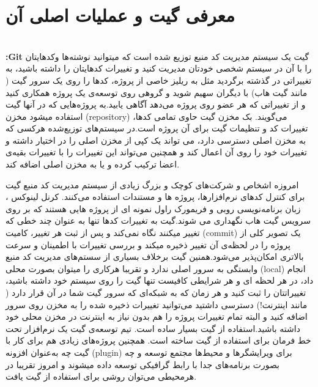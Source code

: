 
\section{معرفی گیت و عملیات اصلی آن}\ \\

\textbf{:Git} \newline
گیت یک سیستم مدیریت کد منبع توزیع شده است که میتوانید نوشته‌ها وکدهایتان را با آن در سیستم شخصی خودتان مدیریت کنید و تغییرات کدهایتان را داشته باشید، به تغییراتی در گذشته برگردید مثل  به ریلیز خاصی از پروژه، کدها را روی یک سرور گیت ( مانند گیت هاب) با دیگران سهیم شوید و گروهی روی توسعه‌ی یک پروژه همکاری کنید و از تغییراتی که هر عضو روی پروژه می‌دهد آگاهی یابید.به پروژه‌هایی که در آنها گیت استفاده میشود مخزن (repository) می‌گویند. بک مخزن گیت حاوی تمامی کدها، تغییرات کد و تنظیمات گیت برای آن پروژه است.در سیستم‌های توزیع‌شده هرکسی که به مخزن اصلی دسترسی دارد، می تواند یک کپی از مخزن اصلی را در اختیار داشته و تغییرات
خود را روی آن اعمال کند و همچنین می‌تواند این تغییرات را با تغییرات بقیه‌ی اعضا ترکیب کرده و یا به مخزن اصلی اضافه کند.  \newline

امروزه اشخاص و شرکت‌های کوچک و بزرگ زیادی از سیستم مدیریت کد منبع گیت برای کنترل کدهای نرم‌افزارها، پروژه ها و مستندات استفاده می‌کنند. کرنل لینوکس ، زبان برنامه‌نویسی روبی و فریمورک  راول نمونه ای از پروژه هایی هستند که بر روی سرویس گیت هاب نگهداری می شوند.گیت به تغییرات کدها تنها به عنوان چند خطی که تغییر میکنند نگاه نمی‌کند و پس از ثبت هر تغییر، کامیت (commit) یک تصویر کلی از پروژه را در لحظه‌ی آن تغییر ذخیره میکند و بررسی تغییرات با اطمینان و سرعت بالاتری امکان‌پذیر می‌شود.همنین گیت برخلاف بسیاری از سستم‌های مدیریت کد منبع وابستگی به سرور اصلی ندارد و تقریبا هرکاری را میتوان بصورت محلی (local) انجام داد، در هر لحظه ای و هر شرایطی کافیست تنها گیت را روی سیستم خود داشته باشید، تغییراتتان را ثبت کنید و هر زمان که به شبکه‌ای که سرور گیت شما در آن قرار دارد ( مانند اینترنت!) دسترسی داشتید می‌توانید تغییرات ذخیره شده را به مخزن روی سرور اضافه کنید و البته تمام تغییرات پروژه را هم بدون نیاز به اینترنت در مخزن محلی خود داشته باشید.استفاده از گیت بسیار ساده است. تیم توسعه‌ی گیت یک نرم‌افزار تحت خط فرمان برای استفاده از گیت ساخته است. همچنین پروژه‌های زیادی هم برای کار با گیت چه به‌عنوان افزونه (plugin) برای ویرایشگرها و محیط‌ها مجتمع توسعه و چه بصورت برنامه‌های جدا با رابط گرافیکی توسعه داده میشوند و امروز تقریبا در هرمحیطی می‌توان روشی برای استفاده از گیت یافت. \newline

